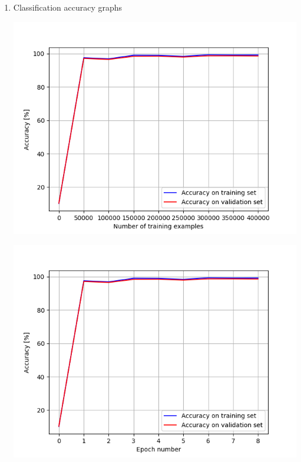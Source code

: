 \documentclass[a4paper]{iacas}
\begin{document}
\begin{enumerate}


\item Classification accuracy graphs

\vskip 0.1in
\begin{minipage}{\linewidth}
	\includegraphics[scale=0.8]{hw2_py/results/_14_01_43/lr_0_01_net_1_CE_/accuracy.png}
	\label{fig_3}
\end{minipage}
\vskip 0.1in
\begin{minipage}{\linewidth}
	\includegraphics[scale=0.8]{hw2_py/results/_14_01_43/lr_0_01_net_1_CE_/accuracy_epoch.png}
	\label{fig_4}
\end{minipage}
\vskip 0.1in
\end{enumerate}
\end{document}
